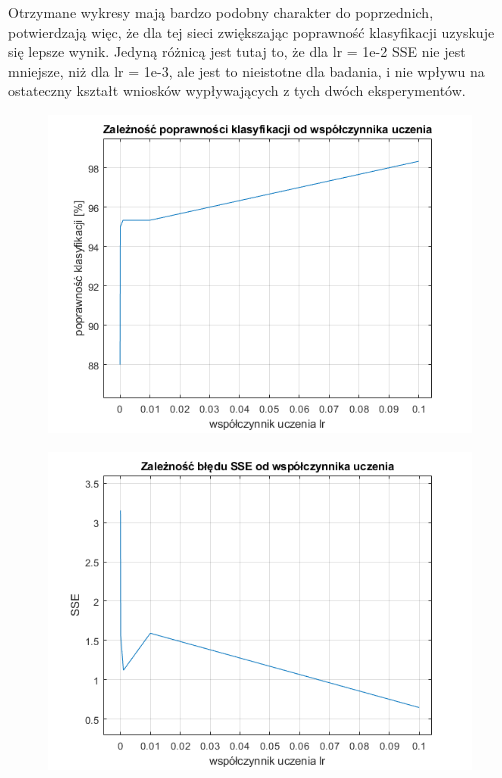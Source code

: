 \documentclass[a4paper, 12pt]{report}
\begin{document}
\newpage
Otrzymane wykresy mają bardzo podobny charakter do poprzednich, potwierdzają więc, że dla tej sieci zwiększając poprawność klasyfikacji uzyskuje się lepsze wynik. Jedyną różnicą jest tutaj to, że dla lr = 1e-2 SSE nie jest mniejsze, niż dla lr = 1e-3, ale jest to nieistotne dla badania, i nie wpływu na ostateczny kształt wniosków wypływających z tych dwóch eksperymentów.

\begin{figure}[hbt!]
\includegraphics[width=14cm]{3621 pk}
\centering
\end{figure}

\begin{figure}[hbt!]
\includegraphics[width=14cm]{3621 sse}
\centering
\end{figure}
  
\end{document}
